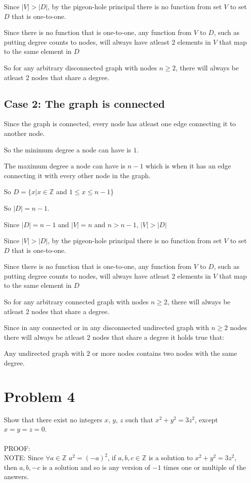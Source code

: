 \documentclass[letterpaper, 11pt]{article}
\begin{document}
Since $|V| > |D|$, by the pigeon-hole principal there is no function from set $V$ to set $D$ that is one-to-one.

Since there is no function that is one-to-one, any function from $V$ to $D$, such as putting degree counts to nodes, will always have atleast $2$ elements in $V$ that map to the same element in $D$

So for any arbitrary disconnected graph with nodes $n \geq 2$, there will always be atleast $2$ nodes that share a degree.

\subsection*{Case 2: The graph is connected}
Since the graph is connected, every node has atleast one edge connecting it to another node.

So the minimum degree a node can have is $1$.

The maximum degree a node can have is $n-1$ which is when it has an edge connecting it with every other node in the graph.

So $D = \{x | x \in \mathbb{Z}$ and $1 \leq x \leq n-1\}$

So $|D| = n-1$.

Since $|D| = n-1$ and $|V| = n$ and $n > n-1$, $|V| > |D|$

Since $|V| > |D|$, by the pigeon-hole principal there is no function from set $V$ to set $D$ that is one-to-one.

Since there is no function that is one-to-one, any function from $V$ to $D$, such as putting degree counts to nodes, will always have atleast $2$ elements in $V$ that map to the same element in $D$

So for any arbitrary connected graph with nodes $n \geq 2$, there will always be atleast $2$ nodes that share a degree.

Since in any connected or in any disconnected undirected graph with $n \geq 2$ nodes there will always be atleast $2$ nodes that share a degree it holds true that:

Any undirected graph with $2$ or more nodes contains two nodes with the same degree.
\newpage
\section{Problem 4}
Show that there exist no integers $x$, $y$, $z$ such that $x^2 + y^2 = 3z^2$, except $x = y = z = 0$.\\\\
PROOF:\\
NOTE: Since $\forall a \in \mathbb{Z}$ $a^2 = (-a)^2$, if $a,b,c \in \mathbb{Z}$ is a solution to $x^2 + y^2 = 3z^2$, then $a, b, -c$ is a solution and so is any version of $-1$ times one or multiple of the answers.
\end{document}
